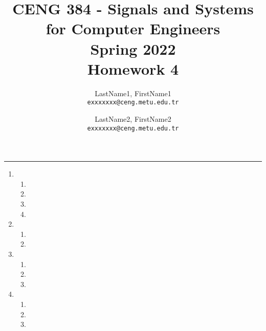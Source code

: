 \documentclass[10pt,a4paper, margin=1in]{article}
\author{
  LastName1, FirstName1\\
  \texttt{exxxxxxx@ceng.metu.edu.tr}
  \and
  LastName2, FirstName2\\
  \texttt{exxxxxxx@ceng.metu.edu.tr}
}
\title{CENG 384 - Signals and Systems for Computer Engineers \\
Spring 2022 \\
Homework 4}
\begin{document}
\maketitle



\noindent\rule{19cm}{1.2pt}

\begin{enumerate}

\item %
    \begin{enumerate}
    \item %
    \item %
    \item %
    \item %
    \end{enumerate}

\item %
    \begin{enumerate}
    \item %
    \item %
    \end{enumerate}

\item %
    \begin{enumerate}
    \item %
    \item %
    \item %
    \end{enumerate}

\item %
    \begin{enumerate}
    \item %
    \item %
    \item %
    \end{enumerate}

\end{enumerate}
\end{document}
